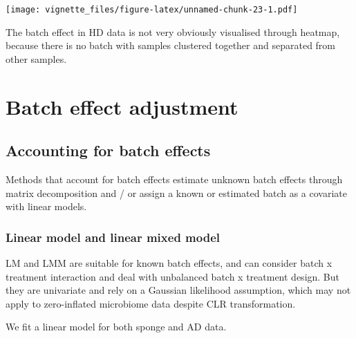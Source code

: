 \documentclass[]{book}
\begin{document}
\texttt{[image: vignette\_files/figure-latex/unnamed-chunk-23-1.pdf]}

The batch effect in HD data is not very obviously visualised through
heatmap, because there is no batch with samples clustered together and
separated from other samples.

\chapter{Batch effect adjustment}\label{adjust}

\section{Accounting for batch
effects}\label{accounting-for-batch-effects}

Methods that account for batch effects estimate unknown batch effects
through matrix decomposition and / or assign a known or estimated batch
as a covariate with linear models.

\subsection{Linear model and linear mixed
model}\label{linear-model-and-linear-mixed-model}

LM and LMM are suitable for known batch effects, and can consider batch
x treatment interaction and deal with unbalanced batch x treatment
design. But they are univariate and rely on a Gaussian likelihood
assumption, which may not apply to zero-inflated microbiome data despite
CLR transformation.

We fit a linear model for both sponge and AD data.
\end{document}
